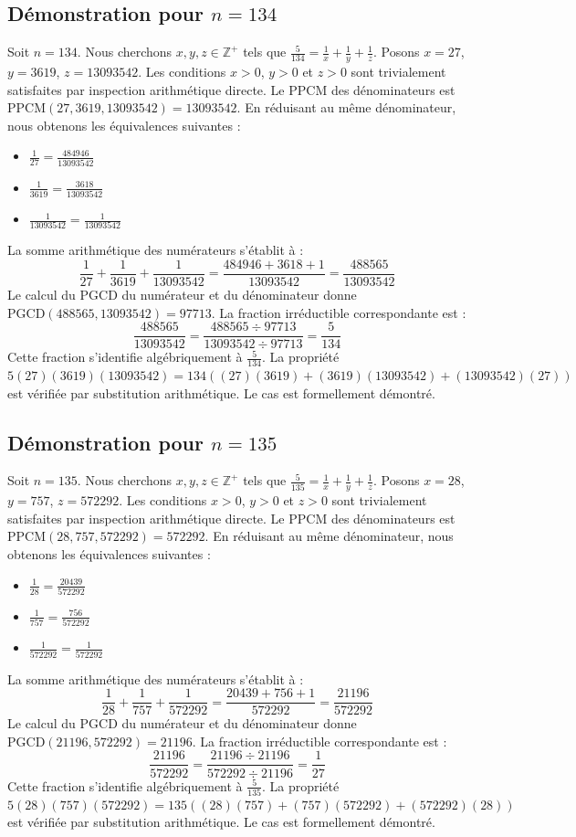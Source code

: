 \documentclass[12pt,a4paper]{article}
\begin{document}
\subsection{Démonstration pour $n = 134$}
Soit $n = 134$. Nous cherchons $x, y, z \in \mathbb{Z}^{+}$ tels que $\frac{5}{134} = \frac{1}{x} + \frac{1}{y} + \frac{1}{z}$.
Posons $x = 27$, $y = 3619$, $z = 13093542$.
Les conditions $x > 0$, $y > 0$ et $z > 0$ sont trivialement satisfaites par inspection arithmétique directe.
Le PPCM des dénominateurs est $\text{PPCM}(27, 3619, 13093542) = 13093542$.
En réduisant au même dénominateur, nous obtenons les équivalences suivantes :
\begin{itemize}
    \item $\frac{1}{27} = \frac{484946}{13093542}$
    \item $\frac{1}{3619} = \frac{3618}{13093542}$
    \item $\frac{1}{13093542} = \frac{1}{13093542}$
\end{itemize}
La somme arithmétique des numérateurs s'établit à :
$$ \frac{1}{27} + \frac{1}{3619} + \frac{1}{13093542} = \frac{484946 + 3618 + 1}{13093542} = \frac{488565}{13093542} $$
Le calcul du PGCD du numérateur et du dénominateur donne $\text{PGCD}(488565, 13093542) = 97713$.
La fraction irréductible correspondante est :
$$ \frac{488565}{13093542} = \frac{488565 \div 97713}{13093542 \div 97713} = \frac{5}{134} $$
Cette fraction s'identifie algébriquement à $\frac{5}{134}$.
La propriété $5(27)(3619)(13093542) = 134((27)(3619) + (3619)(13093542) + (13093542)(27))$ est vérifiée par substitution arithmétique.
Le cas est formellement démontré.

\subsection{Démonstration pour $n = 135$}
Soit $n = 135$. Nous cherchons $x, y, z \in \mathbb{Z}^{+}$ tels que $\frac{5}{135} = \frac{1}{x} + \frac{1}{y} + \frac{1}{z}$.
Posons $x = 28$, $y = 757$, $z = 572292$.
Les conditions $x > 0$, $y > 0$ et $z > 0$ sont trivialement satisfaites par inspection arithmétique directe.
Le PPCM des dénominateurs est $\text{PPCM}(28, 757, 572292) = 572292$.
En réduisant au même dénominateur, nous obtenons les équivalences suivantes :
\begin{itemize}
    \item $\frac{1}{28} = \frac{20439}{572292}$
    \item $\frac{1}{757} = \frac{756}{572292}$
    \item $\frac{1}{572292} = \frac{1}{572292}$
\end{itemize}
La somme arithmétique des numérateurs s'établit à :
$$ \frac{1}{28} + \frac{1}{757} + \frac{1}{572292} = \frac{20439 + 756 + 1}{572292} = \frac{21196}{572292} $$
Le calcul du PGCD du numérateur et du dénominateur donne $\text{PGCD}(21196, 572292) = 21196$.
La fraction irréductible correspondante est :
$$ \frac{21196}{572292} = \frac{21196 \div 21196}{572292 \div 21196} = \frac{1}{27} $$
Cette fraction s'identifie algébriquement à $\frac{5}{135}$.
La propriété $5(28)(757)(572292) = 135((28)(757) + (757)(572292) + (572292)(28))$ est vérifiée par substitution arithmétique.
Le cas est formellement démontré.
\end{document}
